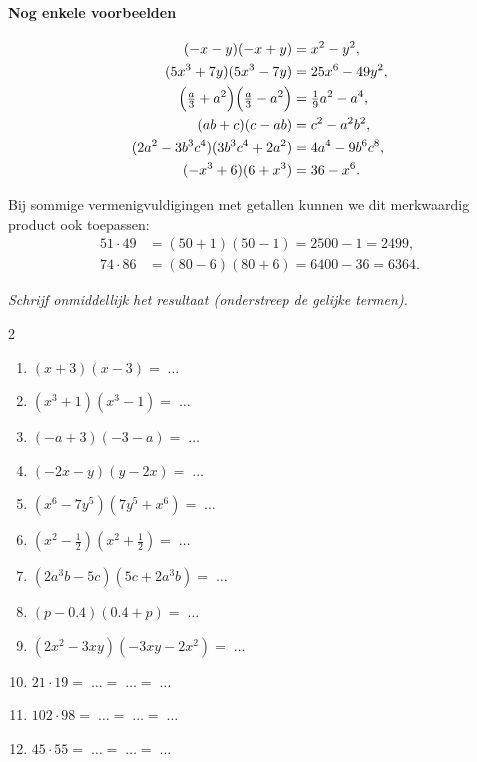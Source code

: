 \documentclass{bis}
\begin{document}
\paragraph*{Nog enkele voorbeelden}
\[
\begin{aligned}
({-}x-y)({-}x+y) &= x^2-y^2,\\
(5x^3+7y)(5x^3-7y) &= 25x^6-49y^2,\\
\Bigl(\tfrac{a}{3}+a^2\Bigr)\Bigl(\tfrac{a}{3}-a^2\Bigr) &= \tfrac{1}{9}a^2-a^4,\\
(ab+c)(c-ab) &= c^2-a^2b^2,\\
(2a^2-3b^3c^4)(3b^3c^4+2a^2) &= 4a^4-9b^6c^8,\\
({-}x^3+6)(6+x^3) &= 36-x^6.
\end{aligned}
\]

Bij sommige vermenigvuldigingen met getallen kunnen we dit merkwaardig product ook toepassen:
\[
\begin{aligned}
51\cdot 49 &= (50+1)(50-1)=2500-1=2499,\\
74\cdot 86 &= (80-6)(80+6)=6400-36=6364.
\end{aligned}
\]

\begin{exercise}
\emph{Schrijf onmiddellijk het resultaat (onderstreep de gelijke termen).}
\begin{multicols}{2}
  \begin{enumerate}
  \item \((x+3)(x-3)=\;\ldots\)
  \item \((x^3+1)(x^3-1)=\;\ldots\)
  \item \(({-}a+3)({-}3-a)=\;\ldots\)
  \item \(({-}2x-y)(y-2x)=\;\ldots\)
  \item \((x^6-7y^5)(7y^5+x^6)=\;\ldots\)
  \item \((x^2-\tfrac{1}{2})(x^2+\tfrac{1}{2})=\;\ldots\)
  \item \((2a^3b-5c)(5c+2a^3b)=\;\ldots\)
  \item \((p-0.4)(0.4+p)=\;\ldots\)
  \item \((2x^2-3xy)({-}3xy-2x^2)=\;\ldots\)
  \item \(21\cdot 19=\;\ldots=\;\ldots=\;\ldots\)
  \item \(102\cdot 98=\;\ldots=\;\ldots=\;\ldots\)
  \item \(45\cdot 55=\;\ldots=\;\ldots=\;\ldots\)
  \end{enumerate}
\end{multicols}
\end{exercise}
\end{document}
